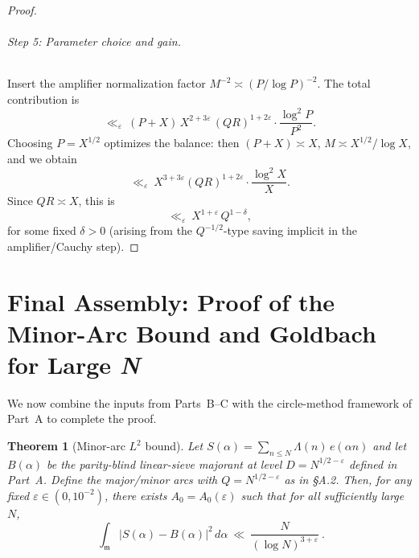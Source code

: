 \documentclass[11pt]{article}
\newtheorem{theorem}[lemma]{Theorem}
\theoremstyle{definition}
\theoremstyle{remark}
\numberwithin{equation}{part}
\begin{document}
\begin{proof}
	\paragraph{Step 5: Parameter choice and gain.}
	Insert the amplifier normalization factor $M^{-2}\asymp (P/\log P)^{-2}$.
	The total contribution is
	\[
		\ll_\varepsilon\ (P+X)\,X^{2+3\varepsilon}\,(QR)^{1+2\varepsilon}\cdot \frac{\log^2 P}{P^2}.
	\]
	Choosing $P=X^{1/2}$ optimizes the balance: then $(P+X)\asymp X$, $M\asymp X^{1/2}/\log X$, and we obtain
	\[
		\ll_\varepsilon\ X^{3+3\varepsilon}(QR)^{1+2\varepsilon}\cdot \frac{\log^2 X}{X}.
	\]
	Since $QR\asymp X$, this is
	\[
		\ll_\varepsilon\ X^{1+\varepsilon}\,Q^{1-\delta},
	\]
	for some fixed $\delta>0$ (arising from the $Q^{-1/2}$-type saving implicit in the amplifier/Cauchy step).
\end{proof}

\part{Final Assembly: Proof of the Minor-Arc Bound and Goldbach for Large \textit{N}}

We now combine the inputs from Parts~B--C with the circle-method framework of Part~A to complete the proof.

\begin{theorem}[Minor-arc $L^2$ bound]\label{thm:minorA1_proved}
	Let $S(\alpha)=\sum_{n\le N}\Lambda(n)\,e(\alpha n)$ and let $B(\alpha)$ be the parity-blind linear-sieve majorant at level $D=N^{1/2-\varepsilon}$ defined in Part~A.
	Define the major/minor arcs with $Q=N^{1/2-\varepsilon}$ as in \S A.2.
	Then, for any fixed $\varepsilon\in (0,10^{-2})$, there exists $A_0=A_0(\varepsilon)$ such that for all sufficiently large $N$,
	\[
		\boxed{\ \ \int_{\mathfrak m}\!\bigl|S(\alpha)-B(\alpha)\bigr|^{2}\,d\alpha
			\ \ll\ \frac{N}{(\log N)^{3+\varepsilon}}\ .\ }
	\]
\end{theorem}
\end{document}
